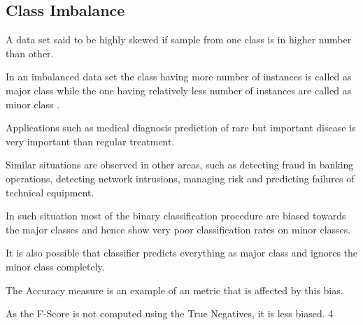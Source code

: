 \documentclass[a4paper,12pt]{article}
\begin{document}
\subsection{Class Imbalance}
\item  A data set said to be highly skewed if sample from one class is in higher number than other.
\item  In an imbalanced data set the class having more number of instances is called as major class
while the one having relatively less number of instances are called as minor class .
\item  Applications such as medical diagnosis prediction of rare but important disease is very important
than regular treatment.
\item  Similar situations are observed in other areas, such as detecting fraud in banking operations,
detecting network intrusions, managing risk and predicting failures of technical equipment.
\item  In such situation most of the binary classification procedure are biased towards the major
classes and hence show very poor classification rates on minor classes.
\item  It is also possible that classifier predicts everything as major class and ignores the minor class
completely.
\item  The Accuracy measure is an example of an metric that is affected by this bias.
\item  As the F-Score is not computed using the True Negatives, it is less biased.
4
\end{document}
